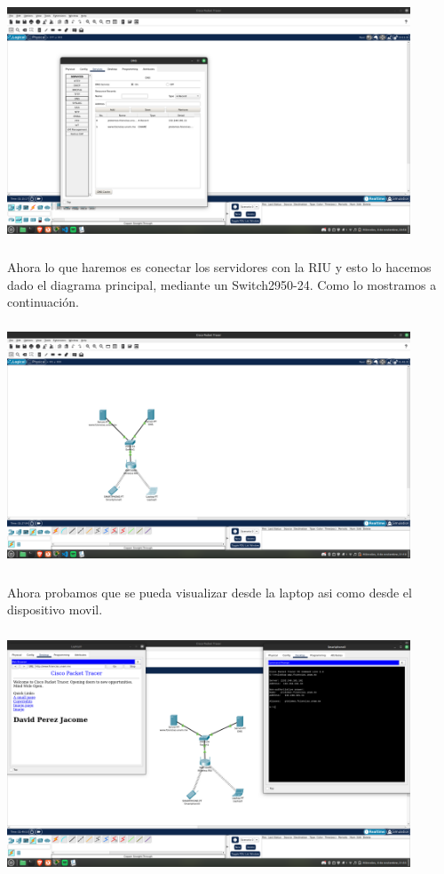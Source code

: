 \documentclass[14pt]{book}
\begin{document}
\includegraphics[width=12cm, height=8cm]{images/ima8.png}\\

Ahora lo que haremos es conectar los servidores con la RIU y esto lo hacemos dado el diagrama principal, mediante un Switch2950-24. Como lo mostramos a continuación.\\

\includegraphics[width=12cm, height=8cm]{images/ima9.png}\\

Ahora probamos que se pueda visualizar desde la laptop asi como desde el dispositivo movil.\\

\includegraphics[width=12cm, height=8cm]{images/prueba de web y smartfphone.png}\\
\end{document}
